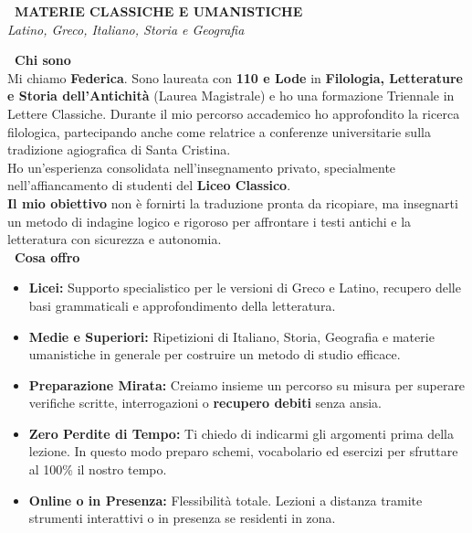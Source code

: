 \documentclass[a4paper,12pt]{article}
\begin{document}
\begin{center}
    {\Huge \textbf{\faLandmark\ MATERIE CLASSICHE E UMANISTICHE}}\\[0.3cm]
    {\Large \textit{Latino, Greco, Italiano, Storia e Geografia}}
\end{center}
\vspace{0.4cm} 

\noindent
\begin{minipage}[t]{0.63\textwidth} 
    \vspace{0pt} %
    
    \textcolor{maincolor}{\Large \textbf{\faUserGraduate\ Chi sono}}\\[0.2cm]
    Mi chiamo \textbf{Federica}. Sono laureata con \textbf{110 e Lode} in \textbf{Filologia, Letterature e Storia dell'Antichità} (Laurea Magistrale) e ho una formazione Triennale in Lettere Classiche. Durante il mio percorso accademico ho approfondito la ricerca filologica, partecipando anche come relatrice a conferenze universitarie sulla tradizione agiografica di Santa Cristina.\\
    Ho un'esperienza consolidata nell'insegnamento privato, specialmente nell'affiancamento di studenti del \textbf{Liceo Classico}. \\\textbf{Il mio obiettivo} non è fornirti la traduzione pronta da ricopiare, ma insegnarti un metodo di indagine logico e rigoroso per affrontare i testi antichi e la letteratura con sicurezza e autonomia.\\[0.4cm]
    
    \textcolor{maincolor}{\Large \textbf{\faChalkboardTeacher\ Cosa offro}}\\[0.2cm]
    \begin{itemize}
        \setlength{\itemsep}{0.25cm} 
        \item[\textcolor{accent}{\faCheckCircle}] \textbf{Licei:} Supporto specialistico per le versioni di Greco e Latino, recupero delle basi grammaticali e approfondimento della letteratura.
        \item[\textcolor{accent}{\faCheckCircle}] \textbf{Medie e Superiori:} Ripetizioni di Italiano, Storia, Geografia e materie umanistiche in generale per costruire un metodo di studio efficace.
        \item[\textcolor{accent}{\faCheckCircle}] \textbf{Preparazione Mirata:} Creiamo insieme un percorso su misura per superare verifiche scritte, interrogazioni o \textbf{recupero debiti} senza ansia.
        \item[\textcolor{accent}{\faCheckCircle}] \textbf{Zero Perdite di Tempo:} Ti chiedo di indicarmi gli argomenti prima della lezione. In questo modo preparo schemi, vocabolario ed esercizi per sfruttare al 100\% il nostro tempo.
        \item[\textcolor{accent}{\faCheckCircle}] \textbf{Online o in Presenza:} Flessibilità totale. Lezioni a distanza tramite strumenti interattivi o in presenza se residenti in zona.
    \end{itemize}\vspace{0.4cm}
    

\end{minipage}
\end{document}
